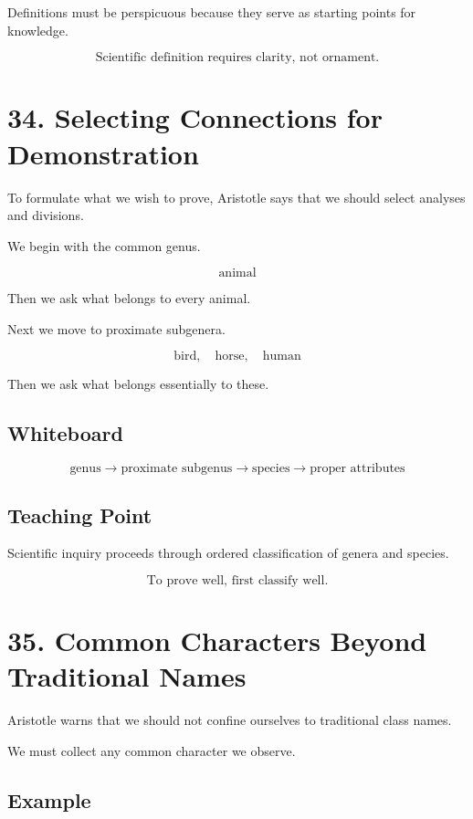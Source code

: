 \documentclass[12pt]{article}
\begin{document}
Definitions must be perspicuous because they serve as starting points for
knowledge.

\[
\boxed{
\text{Scientific definition requires clarity, not ornament.}
}
\]

\section*{34. Selecting Connections for Demonstration}

To formulate what we wish to prove, Aristotle says that we should select
analyses and divisions.

We begin with the common genus.

\[
\text{animal}
\]

Then we ask what belongs to every animal.

Next we move to proximate subgenera.

\[
\text{bird}, \quad \text{horse}, \quad \text{human}
\]

Then we ask what belongs essentially to these.

\subsection*{Whiteboard}

\[
\text{genus}
\rightarrow
\text{proximate subgenus}
\rightarrow
\text{species}
\rightarrow
\text{proper attributes}
\]

\subsection*{Teaching Point}

Scientific inquiry proceeds through ordered classification of genera and
species.

\[
\boxed{
\text{To prove well, first classify well.}
}
\]

\section*{35. Common Characters Beyond Traditional Names}

Aristotle warns that we should not confine ourselves to traditional class names.

We must collect any common character we observe.

\subsection*{Example}
\end{document}
